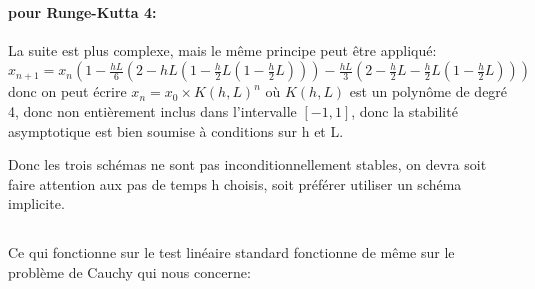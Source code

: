 \documentclass[a4paper,12pt,landscape]{article}
\begin{document}
\paragraph{pour Runge-Kutta 4:}
La suite est plus complexe, mais le même principe peut être appliqué:\\ $x_{n+1}=x_n(1-\frac{hL}{6}(2-hL(1-\frac{h}{2}L(1-\frac{h}{2}L)))-\frac{hL}{3}(2-\frac{h}{2}L-\frac{h}{2}L(1-\frac{h}{2}L)))$ donc on peut écrire $x_n=x_0\times K(h,L)^n$ où $K(h,L)$ est un polynôme de degré 4, donc non entièrement inclus dans l'intervalle $[-1,1]$, donc la stabilité asymptotique est bien soumise à conditions sur h et L.


Donc les trois schémas ne sont pas inconditionnellement stables, on devra soit faire attention aux pas de temps h choisis, soit préférer utiliser un schéma implicite.

\subsection{}
Ce qui fonctionne sur le test linéaire standard fonctionne de même sur le problème de Cauchy qui nous concerne:
\end{document}
